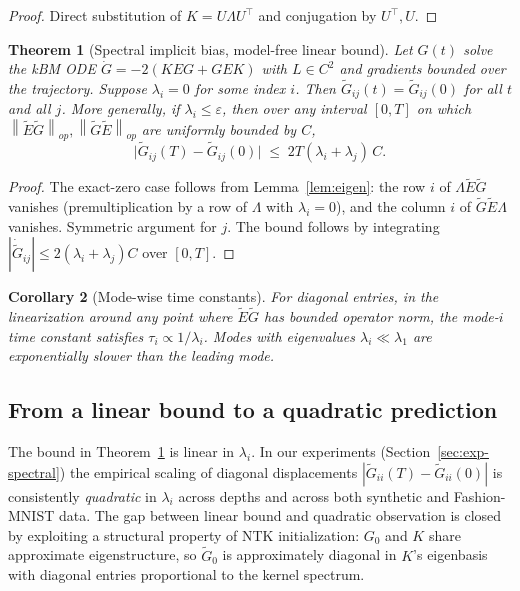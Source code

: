 \documentclass[11pt,letterpaper]{article}
\newtheorem{theorem}{Theorem}
\newtheorem{corollary}[theorem]{Corollary}
\newcommand{\norm}[1]{\left\|#1\right\|}
\newcommand{\E}{E}
\newcommand{\Gtilde}{\widetilde{G}}
\newcommand{\Etilde}{\widetilde{\E}}
\newcommand{\veps}{\varepsilon}
\begin{document}
\begin{proof}
Direct substitution of $K = U\Lambda U^\top$ and conjugation by $U^\top, U$.
\end{proof}

\begin{theorem}[Spectral implicit bias, model-free linear bound]
\label{thm:spectral}
Let $G(t)$ solve the kBM ODE $\dot G = -2(K\E G + G \E K)$ with
$L \in C^2$ and gradients bounded over the trajectory. Suppose
$\lambda_i = 0$ for some index $i$. Then $\Gtilde_{ij}(t) = \Gtilde_{ij}(0)$
for all $t$ and all $j$. More generally, if
$\lambda_i \leq \veps$, then over any interval $[0, T]$ on which
$\norm{\Etilde\Gtilde}_{op}, \norm{\Gtilde\Etilde}_{op}$ are uniformly bounded by $C$,
\[
\bigl|\Gtilde_{ij}(T) - \Gtilde_{ij}(0)\bigr|
\;\leq\; 2T(\lambda_i + \lambda_j)\,C.
\]
\end{theorem}

\begin{proof}
The exact-zero case follows from Lemma~\ref{lem:eigen}: the row $i$ of
$\Lambda \Etilde \Gtilde$ vanishes (premultiplication by a row of $\Lambda$
with $\lambda_i = 0$), and the column $i$ of $\Gtilde \Etilde \Lambda$
vanishes. Symmetric argument for $j$. The bound follows by integrating
$|\dot{\Gtilde}_{ij}| \leq 2(\lambda_i + \lambda_j) C$ over $[0, T]$.
\end{proof}

\begin{corollary}[Mode-wise time constants]
\label{cor:rate}
For diagonal entries, in the linearization around any point where
$\Etilde\Gtilde$ has bounded operator norm, the mode-$i$ time constant
satisfies $\tau_i \propto 1/\lambda_i$. Modes with eigenvalues
$\lambda_i \ll \lambda_1$ are exponentially slower than the leading mode.
\end{corollary}

\subsection{From a linear bound to a quadratic prediction}
\label{sec:refined}

The bound in Theorem~\ref{thm:spectral} is linear in $\lambda_i$. In our
experiments (Section~\ref{sec:exp-spectral}) the empirical scaling of
diagonal displacements $|\Gtilde_{ii}(T) - \Gtilde_{ii}(0)|$ is consistently
\emph{quadratic} in $\lambda_i$ across depths and across both synthetic and
Fashion-MNIST data. The gap between linear bound and quadratic observation
is closed by exploiting a structural property of NTK initialization:
$G_0$ and $K$ share approximate eigenstructure, so $\Gtilde_0$ is
approximately diagonal in $K$'s eigenbasis with diagonal entries
proportional to the kernel spectrum.
\end{document}
